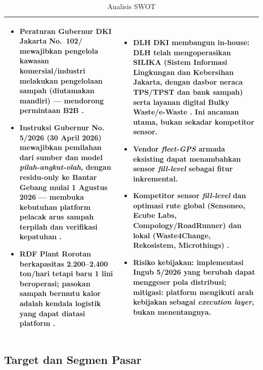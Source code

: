 \begin{table}[H]
\begin{tabularx}{\textwidth}{|>{\RaggedRight\arraybackslash}X|>{\RaggedRight\arraybackslash}X|}
\hline
\begin{itemize}[leftmargin=*,topsep=2pt]
  \item Peraturan Gubernur DKI Jakarta No.\ 102/\allowbreak 2021 mewajibkan pengelola kawasan komersial/industri melakukan pengelolaan sampah (diutamakan mandiri) --- mendorong permintaan B2B \parencite{pergub102}.
  \item Instruksi Gubernur No. 5/2026 (30 April 2026) mewajibkan pemilahan dari sumber dan model \textit{pilah-angkut-olah}, dengan residu-only ke Bantar Gebang mulai 1 Agustus 2026 --- membuka kebutuhan platform pelacak arus sampah terpilah dan verifikasi kepatuhan \parencite{ingub5_2026}.
  \item RDF Plant Rorotan berkapasitas 2.200--2.400 ton/hari tetapi baru 1 lini beroperasi; pasokan sampah bermutu kalor adalah kendala logistik yang dapat diatasi platform \parencite{rorotan2026,kompasrorotan2026}.
\end{itemize}
&
\begin{itemize}[leftmargin=*,topsep=2pt]
  \item \textbf{DLH DKI membangun in-house}: DLH telah mengoperasikan SILIKA (Sistem Informasi Lingkungan dan Kebersihan Jakarta, dengan dasbor neraca TPS/TPST dan bank sampah) serta layanan digital Bulky Waste/e-Waste \parencite{silika2026}. Ini ancaman utama, bukan sekadar kompetitor sensor.
  \item Vendor \textit{fleet-GPS} armada eksisting dapat menambahkan sensor \textit{fill-level} sebagai fitur inkremental.
  \item Kompetitor sensor \textit{fill-level} dan optimasi rute global (Sensoneo, Ecube Labs, Compology/RoadRunner) \parencite{sensoneo2026,ecubelabs2026,compology2022} dan lokal (Waste4Change, Rekosistem, Microthings) \parencite{waste4change2026,microthings2026}.
  \item Risiko kebijakan: implementasi Ingub 5/2026 yang berubah dapat menggeser pola distribusi; mitigasi: platform mengikuti arah kebijakan sebagai \textit{execution layer}, bukan menentangnya.
\end{itemize}
\\
\hline
\end{tabularx}
\caption{Analisis SWOT \ProductName{}}
\end{table}

\subsection{Target dan Segmen Pasar}
\label{sec:3-2}

